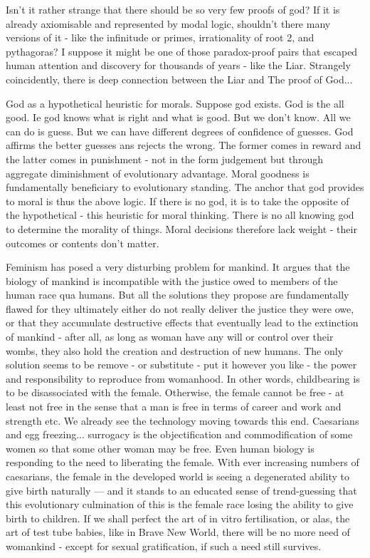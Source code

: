 Isn’t it rather strange that there should be so very few proofs of god? If it is already axiomisable and represented by modal logic, shouldn’t there many versions of it - like the infinitude or primes, irrationality of root 2, and pythagoras? I suppose it might be one of those paradox-proof pairs that escaped human attention and discovery for thousands of years - like the Liar. Strangely coincidently, there is deep connection between the Liar and The proof of God... 


God as a hypothetical heuristic for morals. 
Suppose god exists. God is the all good. Ie god knows what is right and what is good. But we don’t know. All we can do is guess. But we can have different degrees of confidence of guesses. God affirms the better guesses ans rejects the wrong. The former comes in reward and the latter comes in punishment - not in the form judgement but through aggregate diminishment of evolutionary advantage. Moral goodness is fundamentally beneficiary to evolutionary standing. The anchor that god provides to moral is thus the above logic. If there is no god, it is to take the opposite of the hypothetical - this heuristic for moral thinking. There is no all knowing god to determine the morality of things. Moral decisions therefore lack weight - their outcomes or contents don’t matter. 



Feminism has posed a very disturbing problem for mankind. It argues that the biology of mankind is incompatible with the justice owed to members of the human race qua humans. But all the solutions they propose are fundamentally flawed for they ultimately either do not really deliver the justice they were owe, or that they accumulate destructive effects that eventually lead to the extinction of mankind - after all, as long as woman have any will or control over their wombs, they also hold the creation and destruction of new humans. The only solution seems to be remove - or substitute - put it however you like - the power and responsibility to reproduce from womanhood. In other words, childbearing is to be disassociated with the female. Otherwise, the female cannot be free - at least not free in the sense that a man is free in terms of career and work and strength etc. We already see the technology moving towards this end. Caesarians and egg freezing... surrogacy is the objectification and commodification of some women so that some other woman may be free. Even human biology is responding to the need to liberating the female. With ever increasing numbers of caesarians, the female in the developed world is seeing a degenerated ability to give birth naturally — and it stands to an educated sense of trend-guessing that this evolutionary culmination of this is the female race losing the ability to give birth to children. If we shall perfect the art of in vitro fertilisation, or alas, the art of test tube babies, like in Brave New World, there will be no more need of womankind - except for sexual gratification, if such a need still survives. 

